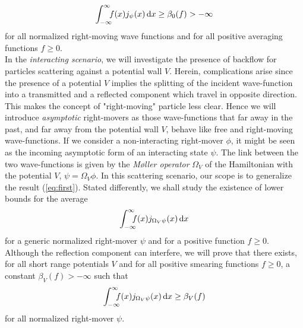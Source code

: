 \begin{equation}
	\int_{-\infty}^{\infty}\!\!\! f(x)j_\psi(x)\, \mathrm d x \ge \beta_0(f)>-\infty
	\label{eq:first}
\end{equation}
for all normalized right-moving wave functions and for all positive averaging functions $f\ge0$.\\
In the \textit{interacting scenario}, we will investigate the presence of backflow for particles scattering against a potential wall $V$. Herein, complications arise since the presence of a potential $V$ implies the splitting of the incident wave-function into a transmitted and a reflected component which travel in opposite direction. This makes the concept of "right-moving" particle less clear. Hence we will introduce \textit{asymptotic} right-movers as those wave-functions that far away in the past, and far away from the potential wall $V$, behave like free and right-moving wave-functions. If we consider a non-interacting right-mover $\phi$, it might be seen as the incoming asymptotic form of an interacting state $\psi$. The link between the two wave-functions is given by the \textit{M\o{}ller operator} $\Omega_V$ of the Hamiltonian with the potential $V$, $\psi=\Omega_V\phi$. In this scattering scenario, our scope is to generalize the result (\ref{eq:first}). Stated differently, we shall study the existence of lower bounds for the average
\begin{equation}
	\int_{-\infty}^{\infty}\!\!\!\!f(x)j_{\Omega_V\psi}(x)\,\mathrm d x
\end{equation}
for a generic normalized right-mover $\psi$ and for a positive function $f\ge0$. Although the reflection component can interfere, we will prove that there exists, for all short range potentials $V$ and for all positive smearing functions $f\ge0$, a constant $\beta_V(f)>-\infty$ such that
\begin{equation}
	\int_{-\infty}^{\infty}\!\!\!\!f(x)j_{\Omega_V\psi}(x)\,\mathrm d x\ge\beta_V(f)
	\label{eq:second}
\end{equation}
for all normalized right-mover $\psi$.\\
 \\ 

